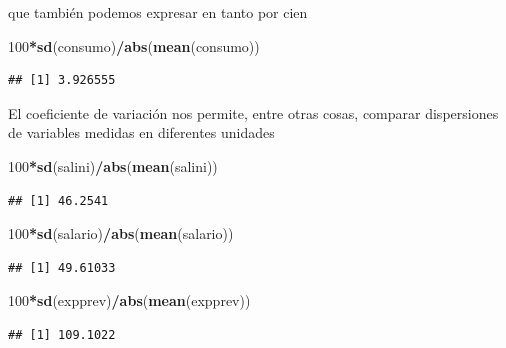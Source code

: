\documentclass[]{book}
\newenvironment{Shaded}{\begin{snugshade}}{\end{snugshade}}
\newcommand{\DecValTok}[1]{\textcolor[rgb]{0.00,0.00,0.81}{#1}}
\newcommand{\KeywordTok}[1]{\textcolor[rgb]{0.13,0.29,0.53}{\textbf{#1}}}
\newcommand{\NormalTok}[1]{#1}
\newcommand{\OperatorTok}[1]{\textcolor[rgb]{0.81,0.36,0.00}{\textbf{#1}}}
\begin{document}
que también podemos expresar en tanto por cien

\begin{Shaded}
\begin{Highlighting}[]
\DecValTok{100}\OperatorTok{*}\KeywordTok{sd}\NormalTok{(consumo)}\OperatorTok{/}\KeywordTok{abs}\NormalTok{(}\KeywordTok{mean}\NormalTok{(consumo))}
\end{Highlighting}
\end{Shaded}

\begin{verbatim}
## [1] 3.926555
\end{verbatim}

El coeficiente de variación nos permite, entre otras cosas, comparar dispersiones de
variables medidas en diferentes unidades

\begin{Shaded}
\begin{Highlighting}[]
\DecValTok{100}\OperatorTok{*}\KeywordTok{sd}\NormalTok{(salini)}\OperatorTok{/}\KeywordTok{abs}\NormalTok{(}\KeywordTok{mean}\NormalTok{(salini))}
\end{Highlighting}
\end{Shaded}

\begin{verbatim}
## [1] 46.2541
\end{verbatim}

\begin{Shaded}
\begin{Highlighting}[]
\DecValTok{100}\OperatorTok{*}\KeywordTok{sd}\NormalTok{(salario)}\OperatorTok{/}\KeywordTok{abs}\NormalTok{(}\KeywordTok{mean}\NormalTok{(salario))}
\end{Highlighting}
\end{Shaded}

\begin{verbatim}
## [1] 49.61033
\end{verbatim}

\begin{Shaded}
\begin{Highlighting}[]
\DecValTok{100}\OperatorTok{*}\KeywordTok{sd}\NormalTok{(expprev)}\OperatorTok{/}\KeywordTok{abs}\NormalTok{(}\KeywordTok{mean}\NormalTok{(expprev))}
\end{Highlighting}
\end{Shaded}

\begin{verbatim}
## [1] 109.1022
\end{verbatim}
\end{document}
